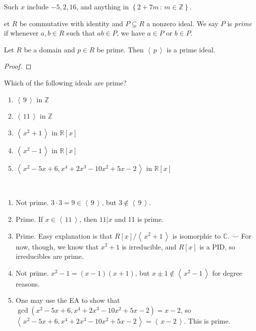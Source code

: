 \documentclass[english,course]{lecture}
\newcommand{\ideal}[1]{\left\langle\, #1 \,\right\rangle}
\newenvironment{solution}[1][Solution]{\begin{trivlist}\pushQED{\qed}\item[\hskip \labelsep  \bfseries #1{}.\hspace{10pt}]}{\popQED\end{trivlist}}\renewcommand{\qedsymbol}{$\checkmark$}{\newenvironment{answer}{\renewcommand\qedsymbol{$\blacklozenge$}\begin{proof}[Answer]}{\end{proof}}}\newenvironment{answer}[1][Answer]{\begin{trivlist}\pushQED{\qed}\item[\hskip \labelsep  \bfseries #1{}.\hspace{10pt}]}{\popQED\end{trivlist}}\renewcommand{\qedsymbol}{$\lozenge$}
\theoremstyle{plain}
\newenvironment{definition}[1]
  {\renewcommand\theinnerdefinition{#1}\innerdefinition}
  {\endinnerdefinition}
\def\setof#1#2{{\left\{#1\,\colon\,#2\right\}}}
\def\C{{\mathbb C}}
\def\Z{{\mathbb Z}}
\def\R{{\mathbb R}}
\def\presnotes{}
\begin{document}
\begin{solution}
	Such $x$ include $-5, 2, 16$, and anything in $\setof{2+7m}{m\in\Z}$.
\end{solution}





\begin{definition}
	Let $R$ be commutative with identity and $P\subsetneq R$ a nonzero ideal.
	We say $P$ is \emph{prime} if whenever $a,b\in R$ such that $ab\in P$, we have $a\in P$ or $b\in P$.
\end{definition}

\begin{theorem}
	Let $R$ be a domain and $p\in R$ be prime.
	Then $\ideal{p}$ is a prime ideal.
\end{theorem}

\begin{proof}

\end{proof}


\begin{exer}
	Which of the following ideals are prime?
	
	\begin{enumerate}
		\item $\ideal{9}$ in $\Z$
		\item $\ideal{11}$ in $\Z$
		\item $\ideal{x^2+1}$ in $\R[x]$
		\item $\ideal{x^2-1}$ in $\R[x]$
		\item $\ideal{x^2-5x+6, x^4+2x^3-10x^2+5x-2}$ in $\R[x]$ %
	\end{enumerate}
\end{exer}

\begin{solution}
\
	\begin{enumerate}
		\item Not prime. $3\cdot 3= 9\in \ideal{9}$, but $3\notin\ideal{9}$.
		\item Prime. If $x\in \ideal{11}$, then $11|x$ and 11 is prime.
		\item Prime. Easy explanation is that $R[x]/\ideal{x^2+1}$ is isomorphic to $\C$. $\ddot\smile$ For now, though, we know that $x^2+1$ is irreducible, and $R[x]$ is a PID, so irreducibles are prime.
		\item Not prime. $x^2-1 = (x-1)(x+1)$, but $x\pm 1\notin \ideal{x^2-1}$ for degree reasons.
		\item One may use the EA to show that $\gcd(x^2-5x+6,x^4+2x^3-10x^2+5x-2) = x-2$, so $\ideal{x^2-5x+6, x^4+2x^3-10x^2+5x-2} = \ideal{x-2}$. This is prime.
	\end{enumerate}
	
\end{solution}
\end{document}
